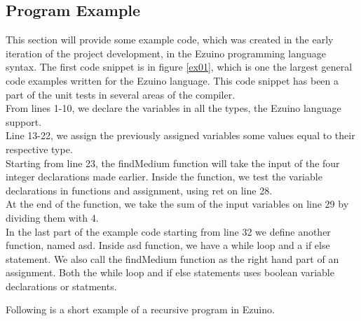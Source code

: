 \subsection{Program Example}
This section will provide some example code, which was created in the early iteration of the project development, in the Ezuino programming language syntax. The first code snippet is in figure \ref{ex01}, which is one the largest general code examples written for the Ezuino language. This code snippet has been a part of the unit tests in several areas of the compiler. \\
From lines 1-10, we declare the variables in all the types, the Ezuino language support. \\
Line 13-22, we assign the previously assigned variables some values equal to their respective type. \\
Starting from line 23, the findMedium function will take the input of the four integer declarations made earlier. Inside the function, we test the variable declarations in functions and assignment, using ret on line 28.\\
At the end of the function, we take the sum of the input variables on line 29 by dividing them with 4. \\
In the last part of the example code starting from line 32 we define another function, named asd. Inside asd function, we have a while loop and a if else statement. We also call the findMedium function as the right hand part of an assignment. Both the while loop and if else statements uses boolean variable declarations or statments.

\noindent\newline
Following is a short example of a recursive program in Ezuino.

\noindent\newline